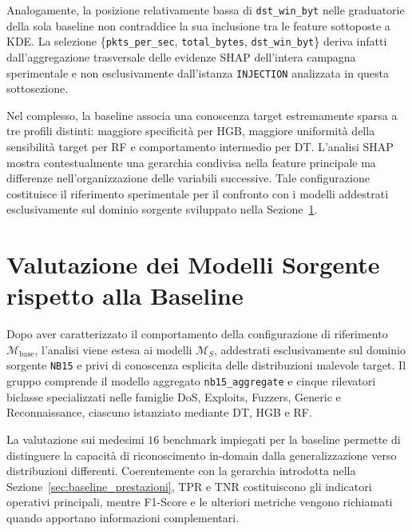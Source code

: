 Analogamente, la posizione relativamente bassa di \texttt{dst\_win\_byt} nelle graduatorie della sola baseline non contraddice la sua inclusione tra le feature sottoposte a KDE. 
La selezione \{\texttt{pkts\_per\_sec}, \texttt{total\_bytes}, \texttt{dst\_win\_byt}\} deriva infatti dall'aggregazione trasversale delle evidenze SHAP dell'intera campagna sperimentale e non esclusivamente dall'istanza \texttt{INJECTION} analizzata in questa sottosezione.

Nel complesso, la baseline associa una conoscenza target estremamente sparsa a tre profili distinti: maggiore specificità per HGB, maggiore uniformità della sensibilità target per RF e comportamento intermedio per DT. 
L'analisi SHAP mostra contestualmente una gerarchia condivisa nella feature principale ma differenze nell'organizzazione delle variabili successive. 
Tale configurazione costituisce il riferimento sperimentale per il confronto con i modelli addestrati esclusivamente sul dominio sorgente sviluppato nella Sezione~\ref{sec:risultati_modelli_sorgente}.




\section{Valutazione dei Modelli Sorgente rispetto alla Baseline}
\label{sec:risultati_modelli_sorgente}

Dopo aver caratterizzato il comportamento della configurazione di riferimento $\mathcal{M}_{\mathrm{base}}$, l'analisi viene estesa ai modelli $\mathcal{M}_{S}$, addestrati esclusivamente sul dominio sorgente \texttt{NB15} e privi di conoscenza esplicita delle distribuzioni malevole target. 
Il gruppo comprende il modello aggregato \texttt{nb15\_aggregate} e cinque rilevatori biclasse specializzati nelle famiglie DoS, Exploits, Fuzzers, Generic e Reconnaissance, ciascuno istanziato mediante DT, HGB e RF.

La valutazione sui medesimi $16$ benchmark impiegati per la baseline permette di distinguere la capacità di riconoscimento in-domain dalla generalizzazione verso distribuzioni differenti. 
Coerentemente con la gerarchia introdotta nella Sezione~\ref{sec:baseline_prestazioni}, TPR e TNR costituiscono gli indicatori operativi principali, mentre F1-Score e le ulteriori metriche vengono richiamati quando apportano informazioni complementari.


